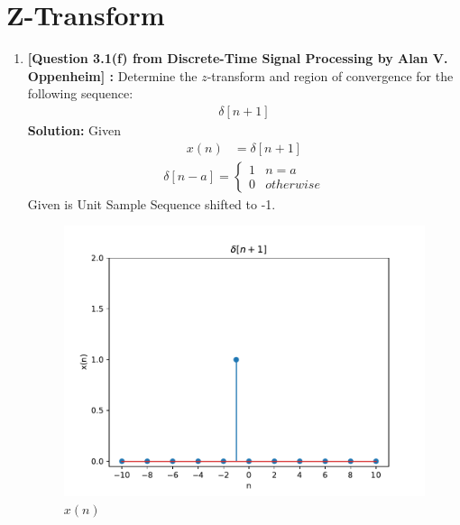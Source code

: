 \documentclass[journal,12pt,twocolumn]{IEEEtran}
\newcommand{\solution}{\noindent \textbf{Solution: }}
\providecommand{\sbrak}[1]{\ensuremath{\left[#1\right]}}
\numberwithin{equation}{section}
\begin{document}
 \section{Z-Transform}
\begin{enumerate}[label=\arabic*]
\item \textbf{[Question 3.1(f) from Discrete-Time Signal Processing by Alan V. Oppenheim] : }Determine the $z$-transform and region of convergence for the following sequence:
\begin{align}
\delta\sbrak{n+1}
\end{align}
\solution Given
\begin{align}
x(n)& = \delta\sbrak{n+1}
\end{align}
\begin{align}
\delta\sbrak{n-a}=
\begin{cases}
1 & n=a\\
0 & otherwise
\end{cases}
\end{align}
Given is Unit Sample Sequence shifted to -1.
\begin{figure}[!ht]
\begin{center}
\includegraphics[width=\columnwidth]{./figs/unitsample}
\end{center}
\caption{$x(n)$}	
\end{figure}


\end{enumerate}
\end{document}
